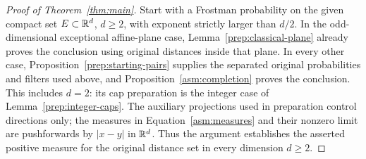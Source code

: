 \begin{proof}[Proof of Theorem~\ref{thm:main}]
Start with a Frostman probability on the given compact set
$E\subset\mathbb R^d$, $d\ge2$, with exponent strictly larger than $d/2$.
In the odd-dimensional exceptional affine-plane case,
Lemma~\ref{prep:classical-plane} already proves the conclusion using
original distances inside that plane.  In every other case,
Proposition~\ref{prep:starting-pairs} supplies the separated original
probabilities and filters used above, and
Proposition~\ref{asm:completion} proves the conclusion.  This includes
$d=2$: its cap preparation is the integer case of
Lemma~\ref{prep:integer-caps}.  The auxiliary projections used in
preparation control directions only; the measures in
Equation~\eqref{asm:measures} and their nonzero limit are pushforwards
by $|x-y|$ in $\mathbb R^d$.  Thus the argument establishes the asserted
positive measure for the original distance set in every dimension
$d\ge2$.
\end{proof}
